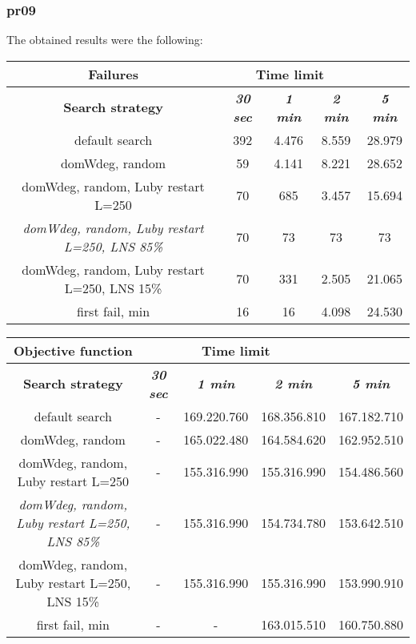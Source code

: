 \subsubsection{pr09}
The obtained results were the following:
{
\renewcommand{\arraystretch}{2}
\begin{longtable}[h]{| c | c | c | c | c |}
    \hline
    \textbf{Failures} & \multicolumn{3}{c}{Time limit} & \\
    \hline
    \textbf{Search strategy} & \textbf{\textit{30 sec}} & \textbf{\textit{1 min}} & \textbf{\textit{2 min}} & \textbf{\textit{5 min}} \\
    \hline
    \endhead
    default search                                         & 392 & 4.476 & 8.559 & 28.979 \\
    \hline
    domWdeg, random                                        &  59 & 4.141 & 8.221 & 28.652 \\
    \hline
    domWdeg, random, Luby restart L=250                    &  70 &  685 & 3.457 & 15.694 \\
    \hline
    \textit{domWdeg, random, Luby restart L=250, LNS 85\%} &  70 &   73 &   73 &    73 \\
    \hline
    domWdeg, random, Luby restart L=250, LNS 15\%          &  70 &  331 & 2.505 &  21.065 \\
    \hline
    first fail, min                                        &  16 &   16 & 4.098 &  24.530 \\
    \hline
\end{longtable}
}

{
\renewcommand{\arraystretch}{2}
\begin{longtable}[h]{| c | c | c | c | c |}
    \hline
    \textbf{Objective function} & \multicolumn{3}{c}{Time limit} & \\
    \hline
    \textbf{Search strategy} & \textbf{\textit{30 sec}} & \textbf{\textit{1 min}} & \textbf{\textit{2 min}} & \textbf{\textit{5 min}} \\
    \hline
    \endhead
    default search                                         & - & 169.220.760 & 168.356.810 & 167.182.710 \\
    \hline
    domWdeg, random                                        & - & 165.022.480 & 164.584.620 & 162.952.510 \\
    \hline
    domWdeg, random, Luby restart L=250                    & - & 155.316.990 & 155.316.990 & 154.486.560 \\
    \hline
    \textit{domWdeg, random, Luby restart L=250, LNS 85\%} & - & 155.316.990 & 154.734.780 & 153.642.510 \\
    \hline
    domWdeg, random, Luby restart L=250, LNS 15\%          & - & 155.316.990 & 155.316.990 & 153.990.910 \\
    \hline
    first fail, min                                        & - &         - & 163.015.510 & 160.750.880 \\
    \hline
\end{longtable}
}

